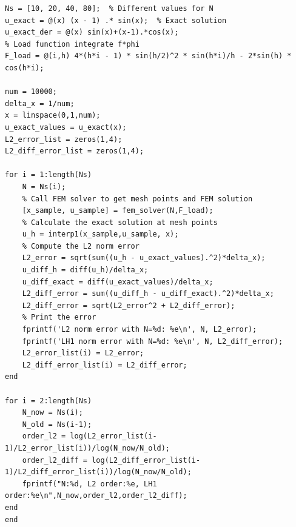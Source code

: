 \documentclass[11pt]{ctexart}
\begin{document}
\begin{lstlisting}[caption={Main Code}]
% Main script: Call FEM solver and plot results for different N values
Ns = [10, 20, 40, 80];  % Different values for N
u_exact = @(x) (x - 1) .* sin(x);  % Exact solution
u_exact_der = @(x) sin(x)+(x-1).*cos(x);
% Load function integrate f*phi
F_load = @(i,h) 4*(h*i - 1) * sin(h/2)^2 * sin(h*i)/h - 2*sin(h) * cos(h*i); 
				
num = 10000;
delta_x = 1/num;
x = linspace(0,1,num);
u_exact_values = u_exact(x);
L2_error_list = zeros(1,4);
L2_diff_error_list = zeros(1,4);

for i = 1:length(Ns)
    N = Ns(i);   
    % Call FEM solver to get mesh points and FEM solution
    [x_sample, u_sample] = fem_solver(N,F_load);
    % Calculate the exact solution at mesh points
    u_h = interp1(x_sample,u_sample, x);
    % Compute the L2 norm error
    L2_error = sqrt(sum((u_h - u_exact_values).^2)*delta_x);
    u_diff_h = diff(u_h)/delta_x;
    u_diff_exact = diff(u_exact_values)/delta_x;
    L2_diff_error = sum((u_diff_h - u_diff_exact).^2)*delta_x;
    L2_diff_error = sqrt(L2_error^2 + L2_diff_error);    
    % Print the error
	fprintf('L2 norm error with N=%d: %e\n', N, L2_error);
	fprintf('LH1 norm error with N=%d: %e\n', N, L2_diff_error);
	L2_error_list(i) = L2_error;
	L2_diff_error_list(i) = L2_diff_error;
end

for i = 2:length(Ns)
    N_now = Ns(i);
    N_old = Ns(i-1);
    order_l2 = log(L2_error_list(i-1)/L2_error_list(i))/log(N_now/N_old);
    order_l2_diff = log(L2_diff_error_list(i-1)/L2_diff_error_list(i))/log(N_now/N_old);
    fprintf("N:%d, L2 order:%e, LH1 order:%e\n",N_now,order_l2,order_l2_diff);
end
end
\end{lstlisting}
\end{document}
